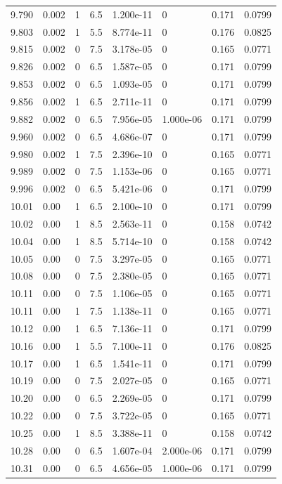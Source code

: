 \documentclass[preview]{standalone}
\begin{document}
{{{{{{{{{{{\begin{tabular}{L{1.2cm}C{1.2cm} C{0.3cm}C{0.5cm} C{1.4cm}C{1.4cm} C{1.4cm}C{1.4cm}}
  9.790  &  0.002  & 1     & 6.5 &  1.200e-11  & 0  & 0.171 &  0.0799   \\ 
  9.803  &  0.002  & 1     & 5.5 &  8.774e-11  & 0  & 0.176 &  0.0825   \\ 
  9.815  &  0.002  & 0     & 7.5 &  3.178e-05  & 0  & 0.165 &  0.0771   \\ 
  9.826  &  0.002  & 0     & 6.5 &  1.587e-05  & 0  & 0.171 &  0.0799   \\ 
  9.853  &  0.002  & 0     & 6.5 &  1.093e-05  & 0  & 0.171 &  0.0799   \\ 
  9.856  &  0.002  & 1     & 6.5 &  2.711e-11  & 0  & 0.171 &  0.0799   \\ 
  9.882  &  0.002  & 0     & 6.5 &  7.956e-05  & 1.000e-06  & 0.171 &  0.0799   \\ 
  9.960  &  0.002  & 0     & 6.5 &  4.686e-07  & 0  & 0.171 &  0.0799   \\ 
  9.980  &  0.002  & 1     & 7.5 &  2.396e-10  & 0  & 0.165 &  0.0771   \\ 
  9.989  &  0.002  & 0     & 7.5 &  1.153e-06  & 0  & 0.165 &  0.0771   \\ 
  9.996  &  0.002  & 0     & 6.5 &  5.421e-06  & 0  & 0.171 &  0.0799   \\ 
  10.01  &  0.00  & 1     & 6.5 &  2.100e-10  & 0  & 0.171 &  0.0799   \\ 
  10.02  &  0.00  & 1     & 8.5 &  2.563e-11  & 0  & 0.158 &  0.0742   \\ 
  10.04  &  0.00  & 1     & 8.5 &  5.714e-10  & 0  & 0.158 &  0.0742   \\ 
  10.05  &  0.00  & 0     & 7.5 &  3.297e-05  & 0  & 0.165 &  0.0771   \\ 
  10.08  &  0.00  & 0     & 7.5 &  2.380e-05  & 0  & 0.165 &  0.0771   \\ 
  10.11  &  0.00  & 0     & 7.5 &  1.106e-05  & 0  & 0.165 &  0.0771   \\ 
  10.11  &  0.00  & 1     & 7.5 &  1.138e-11  & 0  & 0.165 &  0.0771   \\ 
  10.12  &  0.00  & 1     & 6.5 &  7.136e-11  & 0  & 0.171 &  0.0799   \\ 
  10.16  &  0.00  & 1     & 5.5 &  7.100e-11  & 0  & 0.176 &  0.0825   \\ 
  10.17  &  0.00  & 1     & 6.5 &  1.541e-11  & 0  & 0.171 &  0.0799   \\ 
  10.19  &  0.00  & 0     & 7.5 &  2.027e-05  & 0  & 0.165 &  0.0771   \\ 
  10.20  &  0.00  & 0     & 6.5 &  2.269e-05  & 0  & 0.171 &  0.0799   \\ 
  10.22  &  0.00  & 0     & 7.5 &  3.722e-05  & 0  & 0.165 &  0.0771   \\ 
  10.25  &  0.00  & 1     & 8.5 &  3.388e-11  & 0  & 0.158 &  0.0742   \\ 
  10.28  &  0.00  & 0     & 6.5 &  1.607e-04  & 2.000e-06  & 0.171 &  0.0799   \\ 
  10.31  &  0.00  & 0     & 6.5 &  4.656e-05  & 1.000e-06  & 0.171 &  0.0799   \\ 
\hline 
\end{tabular} 

}}}}}}}}}}}
\end{document}
